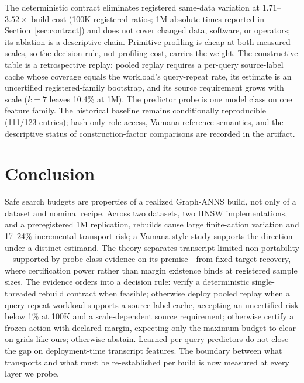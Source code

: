 \documentclass{article}
\begin{document}
The deterministic contract eliminates registered same-data variation at $1.71$--$3.52\times$ build cost
(100K-registered ratios; 1M absolute times reported in Section~\ref{sec:contract}) and does not cover
changed data, software, or operators; its ablation is a descriptive chain. Primitive profiling is cheap at
both measured scales, so the decision rule, not profiling cost, carries the weight. The constructive table
is a retrospective replay: pooled replay requires a per-query source-label cache whose coverage equals the
workload's query-repeat rate, its estimate is an uncertified registered-family bootstrap, and its source
requirement grows with scale ($k{=}7$ leaves 10.4\% at 1M). The predictor probe is one model class on one
feature family. The historical baseline remains conditionally reproducible (111/123 entries); hash-only
role access, Vamana reference semantics, and the descriptive status of construction-factor comparisons are
recorded in the artifact.

\section{Conclusion}
\label{sec:conclusion}

Safe search budgets are properties of a realized Graph-ANNS build, not only of a dataset and nominal
recipe. Across two datasets, two HNSW implementations, and a preregistered 1M replication, rebuilds cause
large finite-action variation and 17--24\% incremental transport risk; a Vamana-style study supports the
direction under a distinct estimand. The theory separates transcript-limited non-portability---supported
by probe-class evidence on its premise---from fixed-target recovery, where certification power rather than
margin existence binds at registered sample sizes. The evidence orders into a decision rule: verify a
deterministic single-threaded rebuild contract when feasible; otherwise deploy pooled replay when a
query-repeat workload supports a source-label cache, accepting an uncertified risk below 1\% at 100K and a
scale-dependent source requirement; otherwise certify a frozen action with declared margin, expecting only
the maximum budget to clear on grids like ours; otherwise abstain. Learned per-query predictors do not
close the gap on deployment-time transcript features. The boundary between what transports and what must be
re-established per build is now measured at every layer we probe.
\end{document}
